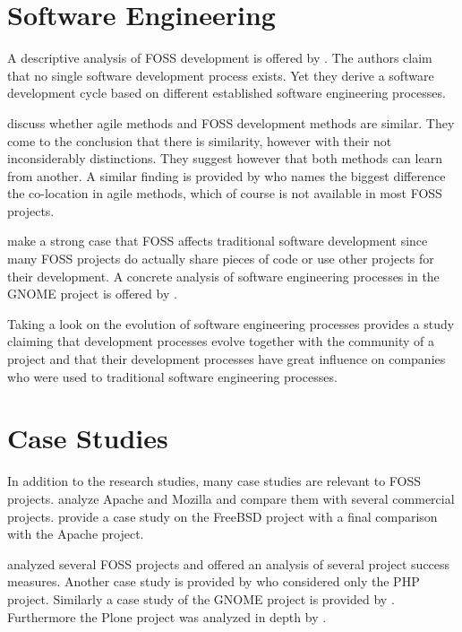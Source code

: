 
\section{Software Engineering} %

A descriptive analysis of \ac{FOSS} development is offered by
\textcite{Roets2007}. The authors claim that no single software development
process exists. Yet they derive a software development cycle based on different
established software engineering processes.

\textcite{Warsta2003} discuss whether agile methods and \ac{FOSS} development
methods are similar. They come to the conclusion that there is similarity,
however with their not inconsiderably distinctions. They suggest however that
both methods can learn from another. A similar finding is provided by
\textcite{Koch2004} who names the biggest difference the co-location in agile
methods, which of course is not available in most \ac{FOSS} projects.

\textcite{Spinellis2004} make a strong case that \ac{FOSS} affects traditional
software development since many \ac{FOSS} projects do actually share pieces of
code or use other projects for their development. A concrete analysis of
software engineering processes in the GNOME project is offered by
\textcite{German2003}.

Taking a look on the evolution of software engineering processes
\textcite{Scacchi2006} provides a study claiming that development processes
evolve together with the community of a project and that their development
processes have great influence on companies who were used to traditional
software engineering processes.


\section{Case Studies} %

In addition to the research studies, many case studies are relevant to
\ac{FOSS} projects. \textcite{Mockus2002} analyze Apache and Mozilla and
compare them with several commercial projects. \textcite{Dinh-Trong2004}
provide a case study on the FreeBSD project with a final comparison with the
Apache project.

\textcite{crowston2004} analyzed several \ac{FOSS} projects and offered an
analysis of several project success measures. Another case study is provided by
\textcite{Magnusson2010} who considered only the PHP project. Similarly a case
study of the GNOME project is provided by \textcite{Koch2002}. Furthermore the
Plone project was analyzed in depth by \textcite{Aspeli2005}.

